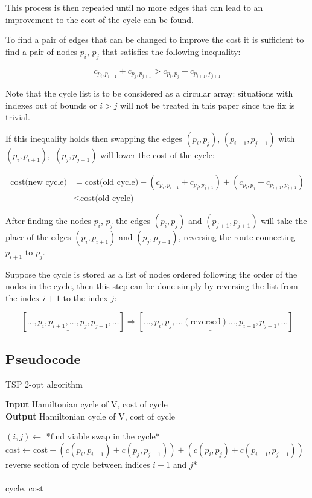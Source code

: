This process is then repeated until no more edges that can lead to an improvement to the cost of the cycle can be found.

To find a pair of edges that can be changed to improve the cost it is sufficient to find a pair of nodes $p_i$, $p_j$ that satisfies the following inequality:

$$c_{p_i,p_{i+1}}+c_{p_j,p_{j+1}} > c_{p_i,p_{j}}+c_{p_{i+1},p_{j+1}}$$

Note that the cycle list is to be considered as a circular array: situations with indexes out of bounds or $i>j$ will not be treated in this paper since the fix is trivial.

If this inequality holds then swapping the edges $(p_i,p_j),\,(p_{i+1},p_{j+1})$ with $(p_i,p_{i+1}),$ $(p_{j},p_{j+1})$ will lower the cost of the cycle:

\begin{align*}
    \mbox{cost(new cycle)}&=\mbox{cost(old cycle)}-(c_{p_i,p_{i+1}}+c_{p_j,p_{j+1}})+(c_{p_i,p_{j}}+c_{p_{i+1},p_{j+1}})\\
    &\leq\mbox{cost(old cycle)}
\end{align*}

After finding the nodes $p_i$, $p_j$ the edges $(p_i, p_j)$ and $(p_{j+1}, p_{j+1})$ will take the place of the edges $(p_i, p_{i+1})$ and $(p_j, p_{j+1})$, reversing the route connecting $p_{i+1}$ to $p_{j}$.

Suppose the cycle is stored as a list of nodes ordered following the order of the nodes in the cycle, then this step can be done simply by reversing the list from the index $i+1$ to the index $j$:

$$[\ldots,p_i,\underline{p_{i+1},\ldots,p_j},p_{j+1},\ldots]\Rightarrow[\ldots,p_i,\underline{p_j,\ldots(\mbox{reversed})\ldots,p_{i+1}},p_{j+1},\ldots]$$

\subsection{Pseudocode}
\begin{algorithm}
    \caption{TSP 2-opt algorithm}

    \textbf{Input} Hamiltonian cycle of V, cost of cycle\\
    \textbf{Output} Hamiltonian cycle of V, cost of cycle\\
    \begin{algorithmic}

            \State $(i, j)\gets$ *find viable swap in the cycle*
            \State $\mbox{cost}\gets\mbox{cost}-(c(p_i,p_{i+1})+c(p_j,p_{j+1}))+(c(p_i,p_{j})+c(p_{i+1},p_{j+1}))$
            \State *reverse section of cycle between indices $i+1$ and $j$*
        \EndWhile\\\\

        \Return cycle, cost

    \end{algorithmic}
\end{algorithm}

